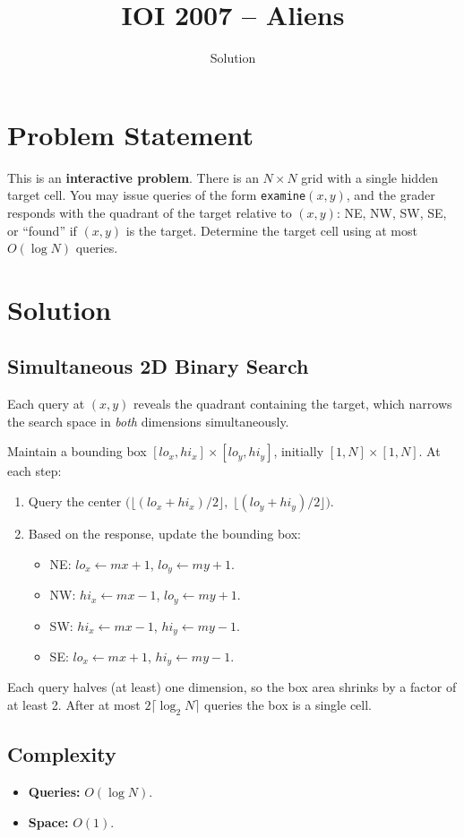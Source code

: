 \documentclass[11pt,a4paper]{article}
\title{IOI 2007 -- Aliens}
\author{Solution}
\date{}
\begin{document}
\maketitle

\section{Problem Statement}
This is an \textbf{interactive problem}. There is an $N \times N$ grid with a single hidden target cell. You may issue queries of the form \texttt{examine}$(x, y)$, and the grader responds with the quadrant of the target relative to $(x, y)$: NE, NW, SW, SE, or ``found'' if $(x,y)$ is the target. Determine the target cell using at most $O(\log N)$ queries.

\section{Solution}

\subsection{Simultaneous 2D Binary Search}
Each query at $(x, y)$ reveals the quadrant containing the target, which narrows the search space in \emph{both} dimensions simultaneously.

Maintain a bounding box $[lo_x, hi_x] \times [lo_y, hi_y]$, initially $[1, N] \times [1, N]$. At each step:
\begin{enumerate}
    \item Query the center $\bigl(\lfloor(lo_x + hi_x)/2\rfloor,\; \lfloor(lo_y + hi_y)/2\rfloor\bigr)$.
    \item Based on the response, update the bounding box:
    \begin{itemize}
        \item NE: $lo_x \gets mx + 1$, $lo_y \gets my + 1$.
        \item NW: $hi_x \gets mx - 1$, $lo_y \gets my + 1$.
        \item SW: $hi_x \gets mx - 1$, $hi_y \gets my - 1$.
        \item SE: $lo_x \gets mx + 1$, $hi_y \gets my - 1$.
    \end{itemize}
\end{enumerate}
Each query halves (at least) one dimension, so the box area shrinks by a factor of at least 2. After at most $2\lceil\log_2 N\rceil$ queries the box is a single cell.

\subsection{Complexity}
\begin{itemize}
    \item \textbf{Queries:} $O(\log N)$.
    \item \textbf{Space:} $O(1)$.
\end{itemize}
\end{document}

